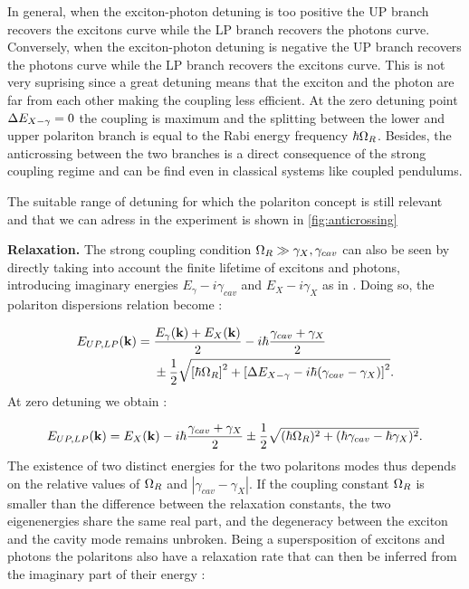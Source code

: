 In general, when the exciton-photon detuning is too positive the UP branch recovers the excitons curve while the LP branch recovers the photons curve. Conversely,
when the exciton-photon detuning is negative the UP branch recovers the photons curve while the LP branch recovers the excitons curve. This is not very suprising
since a great detuning means that the exciton and the photon are far from each other making the coupling less efficient.  At the zero detuning point 
$\Delta E_{X-\gamma}=0$ the coupling is maximum and the splitting between the lower and upper polariton branch is equal to the Rabi energy frequency $\hbar\Omega_R$. Besides, the anticrossing
between the two branches is a direct consequence of the strong coupling regime and can be find even in classical systems like coupled pendulums. 

The suitable range of detuning for which the polariton concept is still relevant and that we can adress in the experiment is shown in \autoref{fig:anticrossing}
\bigskip

\textbf{Relaxation.} The strong coupling condition $\Omega_R \gg \gamma_X, \gamma_{cav}$ can also be seen by directly taking into account
the finite lifetime of excitons and photons, introducing imaginary energies $E_{\gamma}-i \gamma_{cav}$ and $E_X-i\gamma_X$ as in \cite{cohen-tannoudji_photons_2004}.
Doing so, the polariton dispersions relation become :

\begin{align}
    \begin{split}
        E_{UP, LP}(\mathbf{k}) ={}& \dfrac{E_{\gamma}(\mathbf{k}) + E_{X}(\mathbf{k})}{2} - i \hbar \dfrac{\gamma_{cav} + \gamma_X}{2}
        \\& \pm \dfrac{1}{2} \sqrt{\left[ \hbar \Omega_R \right]^2 + \left[ \Delta E_{X-\gamma} - i \hbar (\gamma_{cav} -  \gamma_X )\right]^2}.
    \end{split}
    \label{polariton_disp_loss}
    \end{align}
At zero detuning we obtain :

\begin{equation}
        E_{UP, LP}(\mathbf{k}) =E_{X}(\mathbf{k}) - i \hbar \dfrac{\gamma_{cav} + \gamma_X}{2} \pm \dfrac{1}{2} \sqrt{(\hbar \Omega_R) ^2 +  (\hbar\gamma_{cav} - \hbar \gamma_X )^2}.
    \label{polariton_disp_loss_zero_det}
\end{equation}
The existence of two distinct energies for the two polaritons modes thus depends on the relative values of $\Omega_R$ and $|\gamma_{cav} - \gamma_X|$.
 If the coupling constant $\Omega_R$ is smaller than the difference between the relaxation constants, the two eigenenergies share the same real part, and the degeneracy between the exciton and the cavity mode remains unbroken.
Being a supersposition of excitons and photons the polaritons also have a relaxation rate that can then be inferred from the imaginary part of their energy :

